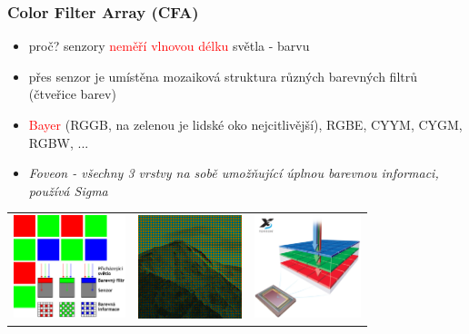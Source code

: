 \documentclass{beamer}
\begin{document}
	\begin{frame}[t,fragile]
		\frametitle{Color Filter Array (CFA)}	
		
		\begin{itemize}
			\item proč? senzory \textcolor{red}{neměří vlnovou délku} světla - barvu
			\item přes senzor je umístěna mozaiková struktura různých barevných filtrů (čtveřice barev)
			\item \textcolor{red}{Bayer} (RGGB, na zelenou je lidské oko nejcitlivější), RGBE, CYYM, CYGM, RGBW, ...
			\item \textit{Foveon - všechny 3 vrstvy na sobě umožňující úplnou barevnou informaci, používá Sigma}

		\end{itemize}			
		
		\vspace{-3mm}\center\begin{tabular}{lll}
			\includegraphics[height=30mm]{bayer-mask.pdf} &		
			\includegraphics[height=30mm]{bayer-image.jpg} &
			\includegraphics[height=30mm]{foveon-cfa.jpg}
		\end{tabular}		
				
	\end{frame}	
	
	
	
\end{document}
